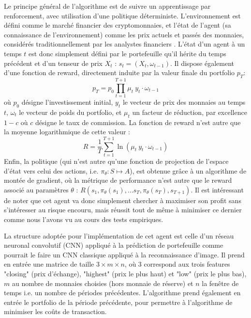 \documentclass[a4paper, 10pt]{article}
\begin{document}
Le principe général de l'algorithme est de suivre un apprentissage par renforcement, avec utilisation d'une politique déterministe. L'environnement est défini comme le marché financier des cryptomonnaies, et l'état de l'agent (sa connaissance de l'environnement) comme les prix actuels et passés des monnaies, considérés traditionnellement par les analystes financiers \cite{Lo2000}. L'état d'un agent à un temps $t$ est donc simplement défini par le portefeuille qu'il hérite du temps précédent et d'un tenseur de prix $X_t$ : $s_t = (X_t, \omega_{t-1})$. Il dispose également d'une fonction de reward, directement induite par la valeur finale du portfolio $p_T$:
\begin{equation}
    p_T = p_0 \prod_{t=1}^{T+1} \mu_t \ y_t \cdot \omega_{t-1}
\label{eq:valeur_finale}
\end{equation}
où $p_0$ désigne l'investissement initial, $y_t$ le vecteur de prix des monnaies au temps $t$, $\omega_t$ le vecteur de poids du portfolio, et $\mu_t$ un facteur de réduction, par excellence $1 - c$ où $c$ désigne le taux de commission. La fonction de reward n'est autre que la moyenne logarithmique de cette valeur :
\begin{equation}
    R = \frac{1}{T} \sum_{t=1}^{T+1} \ln(\mu_t \ y_t \cdot \omega_{t-1})
\end{equation}
Enfin, la politique (qui n'est autre qu'une fonction de projection de l'espace d'état vers celui des actions, i.e. $\pi_{\theta} : S \mapsto A$), est obtenue grâce à un algorithme de montée de gradient, où la  métrique de performance n'est autre que le reward associé au paramètres $\theta$ : $R(s_1, \pi_{\theta} (s_1), ...s_T, \pi_{\theta} (s_T), s_{T+1})$. Il est intéressant de noter que cet agent va donc simplement chercher à maximiser son profit sans s'intéresser au risque encouru, mais réussit tout de même à minimiser ce dernier comme nous l'avons vu au cours des tests empiriques.

La structure adoptée pour l'implémentation de cet agent est celle d'un réseau neuronal convolutif (CNN) appliqué à la prédiction de portefeuille comme pourrait le faire un CNN classique appliqué à la reconnaissance d'image. Il prend en entrée une matrice de taille $3 \times m \times n$, où 3 correspond aux trois features "closing" (prix d'échange), "highest" (prix le plus haut) et "low" (prix le plus bas), $m$ au nombre de monnaies choisies (hors monnaie de réserve) et $n$ la fenêtre de temps i.e. un nombre de périodes précédentes. L'algorithme prend également en entrée le portfolio de la période précédente, pour permettre à l'algorithme de minimiser les coûts de transaction.
\end{document}
